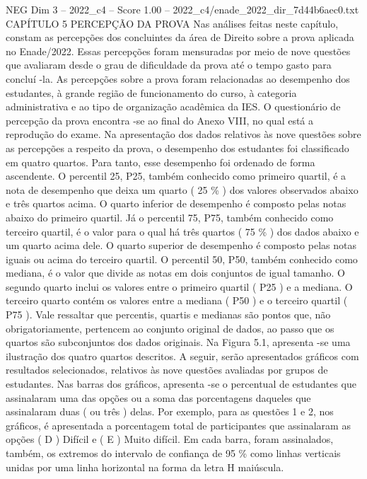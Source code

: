 \begin{textsample}{NEG Dim 3 – 2022\_c4 – Score 1.00 – 2022\_c4/enade\_2022\_dir\_7d44b6aec0.txt}  \label{ex:f3_neg_146}
CAPÍTULO 5 PERCEPÇÃO DA PROVA Nas análises feitas neste capítulo, constam as percepções dos concluintes da área de Direito sobre a prova aplicada no Enade/2022.
Essas percepções foram mensuradas por meio de nove questões que avaliaram desde o grau de dificuldade da prova até o tempo gasto para concluí -la.
As percepções sobre a prova foram relacionadas ao desempenho dos estudantes, à grande região de funcionamento do curso, à categoria administrativa e ao tipo de organização acadêmica da IES.
O questionário de percepção da prova encontra -se ao final do Anexo VIII, no qual está a reprodução do exame.
Na apresentação dos dados relativos às nove questões sobre as percepções a respeito da prova, o desempenho dos estudantes foi classificado em quatro quartos.
Para tanto, esse desempenho foi ordenado de forma ascendente.
O percentil 25, P25, também conhecido como primeiro quartil, é a nota de desempenho que deixa um quarto ( 25 \% ) dos valores observados abaixo e três quartos acima.
O quarto inferior de desempenho é composto pelas notas abaixo do primeiro quartil.
Já o percentil 75, P75, também conhecido como terceiro quartil, é o valor para o qual há três quartos ( 75 \% ) dos dados abaixo e um quarto acima dele.
O quarto superior de desempenho é composto pelas notas iguais ou acima do terceiro quartil.
O percentil 50, P50, também conhecido como mediana, é o valor que divide as notas em dois conjuntos de igual tamanho.
O segundo quarto inclui os valores entre o primeiro quartil ( P25 ) e a mediana.
O terceiro quarto contém os valores entre a mediana ( P50 ) e o terceiro quartil ( P75 ).
Vale ressaltar que percentis, quartis e medianas são pontos que, não obrigatoriamente, pertencem ao conjunto original de dados, ao passo que os quartos são subconjuntos dos dados originais.
Na Figura 5.1, apresenta -se uma ilustração dos quatro quartos descritos.
A seguir, serão apresentados gráficos com resultados selecionados, relativos às nove questões avaliadas por grupos de estudantes.
Nas barras dos gráficos, apresenta -se o percentual de estudantes que assinalaram uma das opções ou a soma das porcentagens daqueles que assinalaram duas ( ou três ) delas.
Por exemplo, para as questões 1 e 2, nos gráficos, é apresentada a porcentagem total de participantes que assinalaram as opções ( D ) Difícil e ( E ) Muito difícil.
Em cada barra, foram assinalados, também, os extremos do intervalo de confiança de 95 \% como linhas verticais unidas por uma linha horizontal na forma da letra H maiúscula.

\end{textsample}
